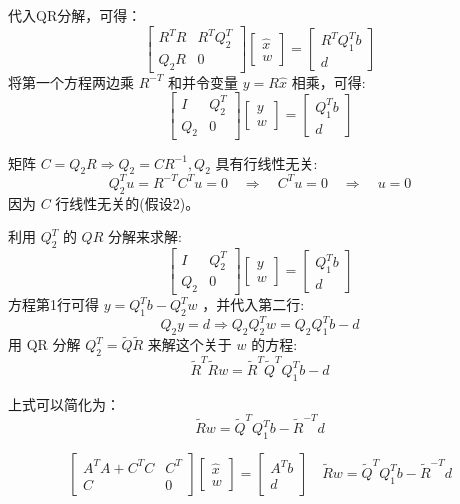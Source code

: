 代入QR分解，可得：
$$
\left[\begin{array}{cc}
R^{T} R & R^{T} Q_{2}^{T} \\
Q_{2} R & 0
\end{array}\right]\left[\begin{array}{c}
\hat{x} \\
w
\end{array}\right]=\left[\begin{array}{c}
R^{T} Q_{1}^{T} b \\
d
\end{array}\right]
$$
将第一个方程两边乘 $ R^{-T} $ 和并令变量 $ y=R \hat{x} $ 相乘，可得:
$$
\left[\begin{array}{cc}
I & Q_{2}^{T} \\
Q_{2} & 0
\end{array}\right]\left[\begin{array}{l}
y \\
w
\end{array}\right]=\left[\begin{array}{c}
Q_{1}^{T} b \\
d
\end{array}\right]
$$

矩阵 $ C=Q_{2} R \Rightarrow Q_{2}=C R^{-1}, Q_{2} $ 具有行线性无关:
$$
Q_{2}^{T} u=R^{-T} C^{T} u=0 \quad \Rightarrow \quad C^{T} u=0 \quad \Rightarrow \quad u=0
$$
因为 $ C $ 行线性无关的(假设2)。

利用 $ Q_{2}^{T} $ 的 $ Q R $ 分解来求解:
$$
\left[\begin{array}{cc}
I & Q_{2}^{T} \\
Q_{2} & 0
\end{array}\right]\left[\begin{array}{l}
y \\
w
\end{array}\right]=\left[\begin{array}{c}
Q_{1}^{T} b \\
d
\end{array}\right]
$$
方程第1行可得 $ y=Q_{1}^{T} b-Q_{2}^{T} w $ ，并代入第二行:
$$
Q_{2} y=d \Rightarrow Q_{2} Q_{2}^{T} w=Q_{2} Q_{1}^{T} b-d
$$
用 $ \mathrm{QR} $ 分解 $ Q_{2}^{T}=\tilde{Q} \tilde{R} $ 来解这个关于 $ w $ 的方程:
$$
\tilde{R}^{T} \tilde{R} w=\tilde{R}^{T} \tilde{Q}^{T} Q_{1}^{T} b-d
$$

上式可以简化为：
$$
\tilde{R} w=\tilde{Q}^{T} Q_{1}^{T} b-\tilde{R}^{-T} d
$$

$$ \left[\begin{array}{cc}A^{T} A+C^{T} C & C^{T} \\ C & 0\end{array}\right]\left[\begin{array}{c}\hat{x} \\ w\end{array}\right]=\left[\begin{array}{c}A^{T} b \\ d\end{array}\right] \quad \tilde{R} w=\tilde{Q}^{T} Q_{1}^{T} b-\tilde{R}^{-T} d $$


